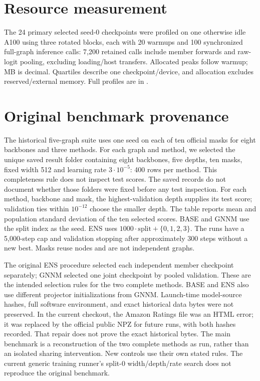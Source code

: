 \section{Resource measurement}\label{app:tuning-resources}
The 24 primary selected seed-0 checkpoints were profiled on one otherwise idle A100 using three rotated blocks, each with 20 warmups and 100 synchronized full-graph inference calls: 7,200 retained calls include member forwards and raw-logit pooling, excluding loading/host transfers. Allocated peaks follow warmup; MB is decimal. Quartiles describe one checkpoint/device, and allocation excludes reserved/external memory. Full profiles are in .

\section{Original benchmark provenance}\label{app:protocol}
The historical five-graph suite uses one seed on each of ten official
masks for eight backbones and three methods. For each graph and method,
we selected the unique saved result folder containing eight backbones,
five depths, ten masks, fixed width 512 and learning rate
$3\cdot10^{-5}$: 400 rows per method. This completeness rule does not
inspect test scores. The saved records do not document whether those
folders were fixed before any test inspection. For each method,
backbone and mask, the highest-validation depth supplies its test
score; validation ties within $10^{-12}$ choose the smaller depth.
The table reports mean and population standard deviation of the ten
selected scores. BASE and GNNM use the split index as the seed. ENS uses
$1000\cdot\mathrm{split}+\{0,1,2,3\}$. The runs have a 5,000-step cap
and validation stopping after approximately 300 steps without a new best.
Masks reuse nodes and are not independent graphs.

The original ENS procedure selected each independent member checkpoint
separately; GNNM selected one joint checkpoint by pooled validation.
These are the intended selection rules for the two complete methods.
BASE and ENS also use different projector initializations from GNNM.
Launch-time model-source hashes,
full software environment, and exact historical data bytes were not
preserved. In the current checkout, the Amazon Ratings file was an
HTML error; it was replaced by the official public NPZ for future
runs, with both hashes recorded. That repair does not prove the exact
historical bytes. The main benchmark is a reconstruction of the two
complete methods as run, rather than an isolated sharing intervention.
New controls use
their own stated rules. The current generic training runner's split-0
width/depth/rate search does not reproduce the original benchmark.


